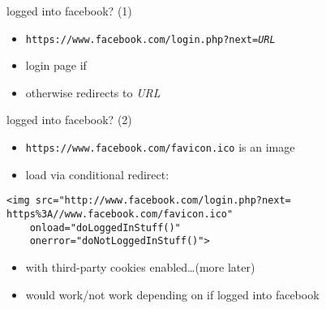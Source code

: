 
\begin{frame}[fragile,label=inFB]{logged into facebook? (1)}
    \begin{itemize}
        \item \texttt{https://www.facebook.com/login.php?next=\textit{URL}}
        \item login page if 
            \item otherwise redirects to \textit{URL}
    \end{itemize}
\end{frame}

\begin{frame}[fragile,label=inFB2]{logged into facebook? (2)}
    \begin{itemize}
        \item \texttt{https://www.facebook.com/favicon.ico} is an image
        \item load via conditional redirect:
    \end{itemize}
    \begin{verbatim}
<img src="http://www.facebook.com/login.php?next= https%3A//www.facebook.com/favicon.ico"
    onload="doLoggedInStuff()"
    onerror="doNotLoggedInStuff()">
\end{verbatim}
    \begin{itemize}
    \item with third-party cookies enabled\ldots (more later)
    \item would work/not work depending on if logged into facebook
    \end{itemize}
\end{frame}
